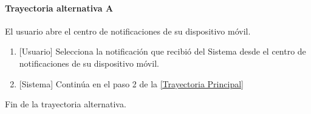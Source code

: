 \paragraph{Trayectoria alternativa A} \label{SUB-U-CU1.9:TA}
 	El usuario abre el centro de notificaciones de su dispositivo móvil.
 	\begin{enumerate}[label=A\arabic*.]
 	    \item {[Usuario]} Selecciona la notificación que recibió del Sistema desde el centro de notificaciones de su dispositivo móvil.
 		\item {[Sistema]} Continúa en el paso 2 de la \hyperref[SUB-U-CU1.9:TP]{[Trayectoria Principal]}
 	\end{enumerate}
 	Fin de la trayectoria alternativa.
